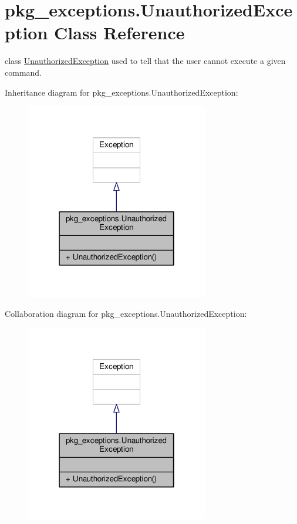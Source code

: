 \hypertarget{classpkg__exceptions_1_1UnauthorizedException}{\section{pkg\-\_\-exceptions.\-Unauthorized\-Exception Class Reference}
\label{classpkg__exceptions_1_1UnauthorizedException}
}


class \hyperlink{classpkg__exceptions_1_1UnauthorizedException}{Unauthorized\-Exception} used to tell that the user cannot execute a given command.  




Inheritance diagram for pkg\-\_\-exceptions.\-Unauthorized\-Exception\-:\nopagebreak
\begin{figure}[H]
\begin{center}
\leavevmode
\includegraphics[width=226pt]{classpkg__exceptions_1_1UnauthorizedException__inherit__graph}
\end{center}
\end{figure}


Collaboration diagram for pkg\-\_\-exceptions.\-Unauthorized\-Exception\-:\nopagebreak
\begin{figure}[H]
\begin{center}
\leavevmode
\includegraphics[width=226pt]{classpkg__exceptions_1_1UnauthorizedException__coll__graph}
\end{center}
\end{figure}
